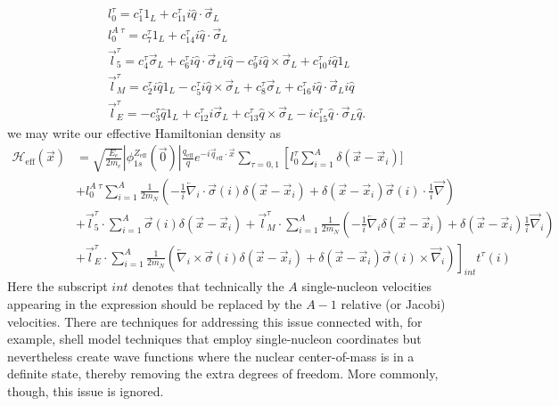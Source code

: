 \documentclass{book}[12pt]
\begin{document}
\begin{equation}
\begin{split}
&l_0^{\tau}=c_1^{\tau}1_L+c_{11}^{\tau}i\hat{q}\cdot\vec{\sigma}_L\\
&l_0^{A\;\tau}=c_7^{\tau}1_L+c_{14}^{\tau}i\hat{q}\cdot\vec{\sigma}_L\\
&\vec{l}_5^{\tau}=c_4^{\tau}\vec{\sigma}_L+c_6^{\tau}i\hat{q}\cdot\vec{\sigma}_Li\hat{q}-c_9^{\tau}i\hat{q}\times\vec{\sigma}_L+c_{10}^{\tau}i\hat{q}1_L\\
&\vec{l}_M^{\tau}=c_2^{\tau}i\hat{q}1_L-c_5^{\tau}i\hat{q}\times\vec{\sigma}_L+c_8^{\tau}\vec{\sigma}_L+c_{16}^{\tau}i\hat{q}\cdot\vec{\sigma}_Li\hat{q}\\
&\vec{l}_E^{\tau}=-c_3^{\tau}\hat{q}1_L+c_{12}^{\tau}i\vec{\sigma}_L+c_{13}^{\tau}\hat{q}\times\vec{\sigma}_L-ic_{15}^{\tau}\hat{q}\cdot\vec{\sigma}_L\hat{q}.
\end{split}
\end{equation}
we may write our effective Hamiltonian density as
\begin{equation}
\begin{split}
\mathcal{H}_\mathrm{eff}(\vec{x})&=\sqrt{\frac{E_e}{2m_e}}|\phi_{1s}^{Z_\mathrm{eff}}(\vec{0})|\frac{q_\mathrm{eff}}{q}e^{-i\vec{q}_\mathrm{eff}\cdot\vec{x}}\sum_{\tau=0,1}\left[l_0^{\tau}\sum_{i=1}^A\delta(\vec{x}-\vec{x}_i)]\right.\\
&\left.+l_0^{A\;\tau}\sum_{i=1}^A\frac{1}{2m_N}\left(-\frac{1}{i}\overleftarrow{\nabla}_i\cdot\vec{\sigma}(i)\delta(\vec{x}-\vec{x}_i)+\delta(\vec{x}-\vec{x}_i)\vec{\sigma}(i)\cdot\frac{1}{i}\overrightarrow{\nabla}\right)\right.\\
&+\vec{l}_5^{\tau}\cdot\sum_{i=1}^A\vec{\sigma}(i)\delta(\vec{x}-\vec{x}_i)+\vec{l}_M^{\tau}\cdot\sum_{i=1}^A\frac{1}{2m_N}\left(-\frac{1}{i}\overleftarrow{\nabla}_i\delta(\vec{x}-\vec{x}_i)+\delta(\vec{x}-\vec{x}_i)\frac{1}{i}\overrightarrow{\nabla}_i\right)\\
&\left.+\vec{l}_E^{\tau}\cdot\sum_{i=1}^A\frac{1}{2m_N}\left(\overleftarrow{\nabla}_i\times\vec{\sigma}(i)\delta(\vec{x}-\vec{x}_i)+\delta(\vec{x}-\vec{x}_i)\vec{\sigma}(i)\times\overrightarrow{\nabla}_i\right)\right]_{int} t^{\tau}(i)
\end{split}
\label{eq:H_NRET}
\end{equation}
Here the subscript $int$ denotes that technically the $A$ single-nucleon velocities appearing in the expression should be replaced by the $A-1$ relative (or Jacobi) velocities. There are techniques for addressing this issue connected with, for example, shell model techniques that employ single-nucleon coordinates but nevertheless create wave functions where the nuclear center-of-mass is in a definite state, thereby removing the extra degrees of freedom. More commonly, though, this issue is ignored.
\end{document}
